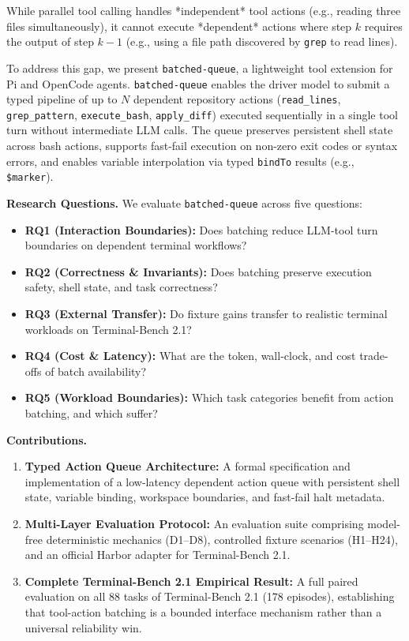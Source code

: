 \documentclass{article}
\begin{document}
While parallel tool calling \citep{toolformer2023, gorilla2023} handles *independent* tool actions (e.g., reading three files simultaneously), it cannot execute *dependent* actions where step $k$ requires the output of step $k-1$ (e.g., using a file path discovered by \texttt{grep} to read lines).

To address this gap, we present \texttt{batched-queue}, a lightweight tool extension for Pi and OpenCode agents. \texttt{batched-queue} enables the driver model to submit a typed pipeline of up to $N$ dependent repository actions (\texttt{read\_lines}, \texttt{grep\_pattern}, \texttt{execute\_bash}, \texttt{apply\_diff}) executed sequentially in a single tool turn without intermediate LLM calls. The queue preserves persistent shell state across bash actions, supports fast-fail execution on non-zero exit codes or syntax errors, and enables variable interpolation via typed \texttt{bindTo} results (e.g., \texttt{\${marker}}).

\textbf{Research Questions.} We evaluate \texttt{batched-queue} across five questions:
\begin{itemize}
    \item \textbf{RQ1 (Interaction Boundaries):} Does batching reduce LLM-tool turn boundaries on dependent terminal workflows?
    \item \textbf{RQ2 (Correctness \& Invariants):} Does batching preserve execution safety, shell state, and task correctness?
    \item \textbf{RQ3 (External Transfer):} Do fixture gains transfer to realistic terminal workloads on Terminal-Bench 2.1?
    \item \textbf{RQ4 (Cost \& Latency):} What are the token, wall-clock, and cost trade-offs of batch availability?
    \item \textbf{RQ5 (Workload Boundaries):} Which task categories benefit from action batching, and which suffer?
\end{itemize}

\textbf{Contributions.}
\begin{enumerate}
    \item \textbf{Typed Action Queue Architecture:} A formal specification and implementation of a low-latency dependent action queue with persistent shell state, variable binding, workspace boundaries, and fast-fail halt metadata.
    \item \textbf{Multi-Layer Evaluation Protocol:} An evaluation suite comprising model-free deterministic mechanics (D1--D8), controlled fixture scenarios (H1--H24), and an official Harbor adapter for Terminal-Bench 2.1.
    \item \textbf{Complete Terminal-Bench 2.1 Empirical Result:} A full paired evaluation on all 88 tasks of Terminal-Bench 2.1 (178 episodes), establishing that tool-action batching is a bounded interface mechanism rather than a universal reliability win.
\end{enumerate}
\end{document}
